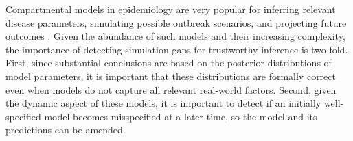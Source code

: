 \documentclass[twoside,11pt]{article}
\newcommand{\0}{\boldsymbol{0}}
\renewcommand{\cite}[1]{\citep{#1}}
\begin{document}

Compartmental models in epidemiology are very popular for inferring relevant disease parameters, simulating possible outbreak scenarios, and projecting future outcomes \cite{covid_germany}.
Given the abundance of such models and their increasing complexity, the importance of detecting simulation gaps for trustworthy inference is two-fold. 
First, since substantial conclusions are based on the posterior distributions of model parameters, it is important that these distributions are formally correct even when models do not capture all relevant real-world factors. 
Second, given the dynamic aspect of these models, it is important to detect if an initially well-specified model becomes misspecified at a later time, so the model and its predictions can be amended.
\end{document}

